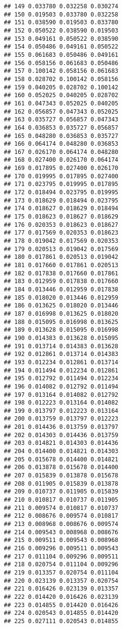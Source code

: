 \documentclass[]{article}
\begin{document}
\begin{verbatim}
## 149 0.033780 0.032258 0.030274
## 150 0.019503 0.033780 0.032258
## 151 0.038590 0.019503 0.033780
## 152 0.050522 0.038590 0.019503
## 153 0.049161 0.050522 0.038590
## 154 0.050486 0.049161 0.050522
## 155 0.061683 0.050486 0.049161
## 156 0.058156 0.061683 0.050486
## 157 0.100142 0.058156 0.061683
## 158 0.028702 0.100142 0.058156
## 159 0.040205 0.028702 0.100142
## 160 0.052025 0.040205 0.028702
## 161 0.047343 0.052025 0.040205
## 162 0.056857 0.047343 0.052025
## 163 0.035727 0.056857 0.047343
## 164 0.036853 0.035727 0.056857
## 165 0.048280 0.036853 0.035727
## 166 0.064174 0.048280 0.036853
## 167 0.026170 0.064174 0.048280
## 168 0.027400 0.026170 0.064174
## 169 0.017895 0.027400 0.026170
## 170 0.019995 0.017895 0.027400
## 171 0.023795 0.019995 0.017895
## 172 0.018494 0.023795 0.019995
## 173 0.018629 0.018494 0.023795
## 174 0.018627 0.018629 0.018494
## 175 0.018623 0.018627 0.018629
## 176 0.020353 0.018623 0.018627
## 177 0.017569 0.020353 0.018623
## 178 0.019042 0.017569 0.020353
## 179 0.020513 0.019042 0.017569
## 180 0.017861 0.020513 0.019042
## 181 0.017660 0.017861 0.020513
## 182 0.017838 0.017660 0.017861
## 183 0.012959 0.017838 0.017660
## 184 0.013446 0.012959 0.017838
## 185 0.018020 0.013446 0.012959
## 186 0.013625 0.018020 0.013446
## 187 0.016998 0.013625 0.018020
## 188 0.015095 0.016998 0.013625
## 189 0.013628 0.015095 0.016998
## 190 0.014383 0.013628 0.015095
## 191 0.013714 0.014383 0.013628
## 192 0.012861 0.013714 0.014383
## 193 0.012234 0.012861 0.013714
## 194 0.011494 0.012234 0.012861
## 195 0.012792 0.011494 0.012234
## 196 0.014082 0.012792 0.011494
## 197 0.013164 0.014082 0.012792
## 198 0.012223 0.013164 0.014082
## 199 0.013797 0.012223 0.013164
## 200 0.013759 0.013797 0.012223
## 201 0.014436 0.013759 0.013797
## 202 0.014303 0.014436 0.013759
## 203 0.014821 0.014303 0.014436
## 204 0.014400 0.014821 0.014303
## 205 0.015678 0.014400 0.014821
## 206 0.013878 0.015678 0.014400
## 207 0.015839 0.013878 0.015678
## 208 0.011905 0.015839 0.013878
## 209 0.010737 0.011905 0.015839
## 210 0.010817 0.010737 0.011905
## 211 0.009574 0.010817 0.010737
## 212 0.008676 0.009574 0.010817
## 213 0.008968 0.008676 0.009574
## 214 0.009543 0.008968 0.008676
## 215 0.009511 0.009543 0.008968
## 216 0.009296 0.009511 0.009543
## 217 0.011104 0.009296 0.009511
## 218 0.020754 0.011104 0.009296
## 219 0.013357 0.020754 0.011104
## 220 0.023139 0.013357 0.020754
## 221 0.016426 0.023139 0.013357
## 222 0.014420 0.016426 0.023139
## 223 0.014855 0.014420 0.016426
## 224 0.020543 0.014855 0.014420
## 225 0.027111 0.020543 0.014855

\end{verbatim}
\end{document}
